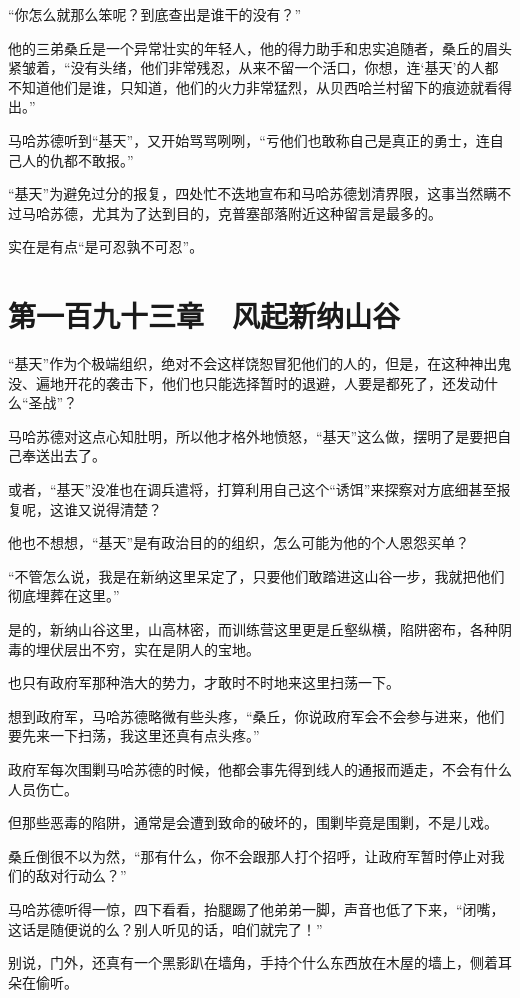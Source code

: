 “你怎么就那么笨呢？到底查出是谁干的没有？”

他的三弟桑丘是一个异常壮实的年轻人，他的得力助手和忠实追随者，桑丘的眉头紧皱着，“没有头绪，他们非常残忍，从来不留一个活口，你想，连‘基天’的人都不知道他们是谁，只知道，他们的火力非常猛烈，从贝西哈兰村留下的痕迹就看得出。”

马哈苏德听到“基天”，又开始骂骂咧咧，“亏他们也敢称自己是真正的勇士，连自己人的仇都不敢报。”

“基天”为避免过分的报复，四处忙不迭地宣布和马哈苏德划清界限，这事当然瞒不过马哈苏德，尤其为了达到目的，克普塞部落附近这种留言是最多的。

实在是有点“是可忍孰不可忍”。

\section{第一百九十三章　风起新纳山谷}

“基天”作为个极端组织，绝对不会这样饶恕冒犯他们的人的，但是，在这种神出鬼没、遍地开花的袭击下，他们也只能选择暂时的退避，人要是都死了，还发动什么“圣战”？

马哈苏德对这点心知肚明，所以他才格外地愤怒，“基天”这么做，摆明了是要把自己奉送出去了。

或者，“基天”没准也在调兵遣将，打算利用自己这个“诱饵”来探察对方底细甚至报复呢，这谁又说得清楚？

他也不想想，“基天”是有政治目的的组织，怎么可能为他的个人恩怨买单？

“不管怎么说，我是在新纳这里呆定了，只要他们敢踏进这山谷一步，我就把他们彻底埋葬在这里。”

是的，新纳山谷这里，山高林密，而训练营这里更是丘壑纵横，陷阱密布，各种阴毒的埋伏层出不穷，实在是阴人的宝地。

也只有政府军那种浩大的势力，才敢时不时地来这里扫荡一下。

想到政府军，马哈苏德略微有些头疼，“桑丘，你说政府军会不会参与进来，他们要先来一下扫荡，我这里还真有点头疼。”

政府军每次围剿马哈苏德的时候，他都会事先得到线人的通报而遁走，不会有什么人员伤亡。

但那些恶毒的陷阱，通常是会遭到致命的破坏的，围剿毕竟是围剿，不是儿戏。

桑丘倒很不以为然，“那有什么，你不会跟那人打个招呼，让政府军暂时停止对我们的敌对行动么？”

马哈苏德听得一惊，四下看看，抬腿踢了他弟弟一脚，声音也低了下来，“闭嘴，这话是随便说的么？别人听见的话，咱们就完了！”

别说，门外，还真有一个黑影趴在墙角，手持个什么东西放在木屋的墙上，侧着耳朵在偷听。

